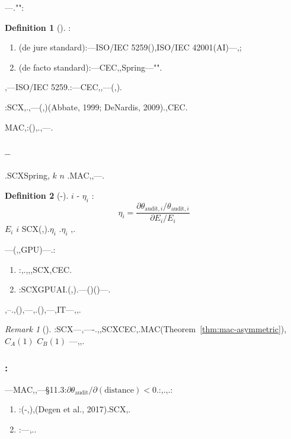 \documentclass[12pt,a4paper]{article}
\theoremstyle{definition}
\newtheorem{definition}{Definition}[section]
\theoremstyle{remark}
\newtheorem{remark}{Remark}[section]
\begin{document}
---."":

\begin{definition}[]
:
\begin{enumerate}[label=(\alph*)]
    \item \textbf{}(de jure standard):---ISO/IEC 5259(),ISO/IEC 42001(AI)---,;
    \item \textbf{}(de facto standard):---CEC,,Spring---"".
\end{enumerate}
,---ISO/IEC 5259.:---CEC,,---(,).
\end{definition}

:SCX,.,---(,)(Abbate, 1999; DeNardis, 2009).,CEC.

MAC,:(),.,---.

\subsubsection*{--}

.SCXSpring, $k$  $n$ .MAC,,---.

\begin{definition}[-]
 $i$ - $\eta_i$ :
\begin{equation}
\eta_i = \frac{\partial \theta_{\text{audit}, i} / \theta_{\text{audit}, i}}{\partial E_i / E_i}
\end{equation}
 $E_i$  $i$ SCX(,).$\eta_i$ .$\eta_i$ ,.
\end{definition}

---(,,GPU)---.:

\begin{enumerate}[label=(\roman*)]
    \item \textbf{}:,.,,,SCX,CEC.
    \item \textbf{}:SCXGPUAI.(,).---()()---.
\end{enumerate}

,--.,(),---,.(),---,IT---,,.

\begin{remark}[]
:SCX---,----.,,SCXCEC,.MAC(Theorem~\ref{thm:mac-asymmetric}), $C_A(1)$  $C_B(1)$ ---,,.
\end{remark}

\subsubsection*{:}

---MAC,,---§11.3:$\partial \theta_{\text{audit}} / \partial (\text{distance}) < 0$.:,.,.:

\begin{enumerate}[label=(\roman*)]
    \item \textbf{}:(-,),(Degen et al., 2017).SCX,.
    \item \textbf{}:---,..
\end{enumerate}
\end{document}
